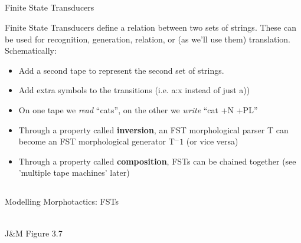 \documentclass[9pt,xcolor=pdftex,dvipsnames,table]{beamer}
\begin{document}
\subsection{}
\begin{frame}{Finite State Transducers}

{\large Finite State Transducers define a relation between two sets of strings.  These can be used for recognition, generation, relation, or (as we'll use them) translation.  Schematically:}

\begin{itemize}
	\item Add a second tape to represent the second set of strings.
	\item Add extra symbols to the transitions (i.e. a:x instead of just a))\pause
	\item On one tape we \emph{read} ``cats'', on the other we \emph{write} ``cat +N +PL''\pause
	\item Through a property called \textbf{inversion}, an FST morphological parser T can become an FST morphological generator T$^-1$ (or vice versa)
	\item Through a property called \textbf{composition}, FSTs can be chained together (see 'multiple tape machines' later)
\end{itemize}

\end{frame}

\subsection{}
\begin{frame}{Modelling Morphotactics: FSTs}

\begin{center}
	\\
	{\large J\&M Figure 3.7}\\
\end{center}
\end{frame}
\end{document}
